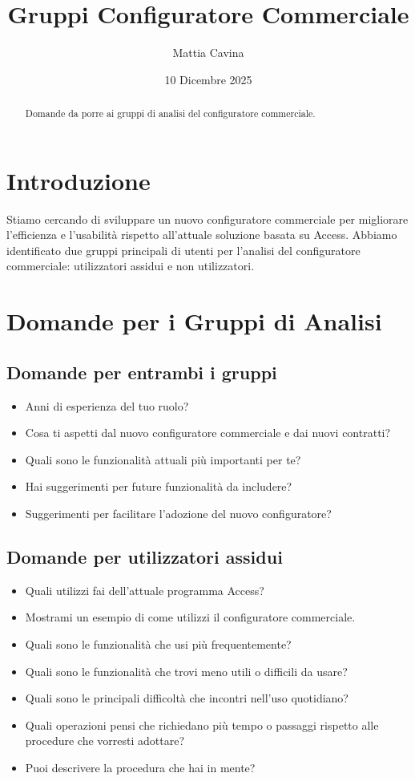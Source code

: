 \documentclass[12pt, a4paper]{article} %
\title{Gruppi Configuratore Commerciale}
\author{Mattia Cavina}
\date{10 Dicembre 2025}
\begin{document}
\maketitle

\begin{abstract}
    Domande da porre ai gruppi di analisi del configuratore commerciale.
\end{abstract}

\section{Introduzione}
Stiamo cercando di sviluppare un nuovo configuratore commerciale per migliorare
l'efficienza e l'usabilità rispetto all'attuale soluzione basata su Access.
Abbiamo identificato due gruppi principali di utenti per l'analisi del
configuratore commerciale: utilizzatori assidui e non utilizzatori.

\section{Domande per i Gruppi di Analisi}
\subsection{Domande per entrambi i gruppi}
\begin{itemize}
    \item Anni di esperienza del tuo ruolo?
    \item Cosa ti aspetti dal nuovo configuratore commerciale e dai nuovi contratti?
    \item Quali sono le funzionalità attuali più importanti per te?
    \item Hai suggerimenti per future funzionalità da includere?
    \item Suggerimenti per facilitare l'adozione del nuovo configuratore?
\end{itemize}\label{GenericQuestions}

\subsection{Domande per utilizzatori assidui}
\begin{itemize}
    \item Quali utilizzi fai dell'attuale programma Access?
    \item Mostrami un esempio di come utilizzi il configuratore commerciale.
    \item Quali sono le funzionalità che usi più frequentemente?
    \item Quali sono le funzionalità che trovi meno utili o difficili da usare?
    \item Quali sono le principali difficoltà che incontri nell'uso quotidiano?
    \item Quali operazioni pensi che richiedano più tempo o passaggi rispetto alle
          procedure che vorresti adottare?
    \item Puoi descrivere la procedura che hai in mente?
\end{itemize}\label{VendorQuestions}
\end{document}
